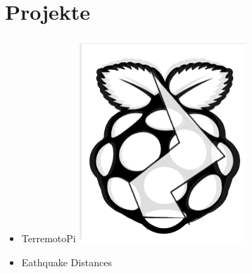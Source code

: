 \documentclass{article}
\begin{document}
\begin{minipage}[t]{0.67\textwidth}
		\section*{\fontsize{18pt}{24pt}\selectfont \color{pblue} Projekte}
		\begin{itemize}
		\item TerremotoPi \href{https://github.com/silvioschwarz/TerremotoPi}{\includegraphics[scale=0.05]{img/terremotoPiIcon.png}}
		\item Eathquake Distances \href{https://github.com/silvioschwarz/Earthquake-Distances}{\faGithub}
		\end{itemize}
\end{minipage}
\end{document}
